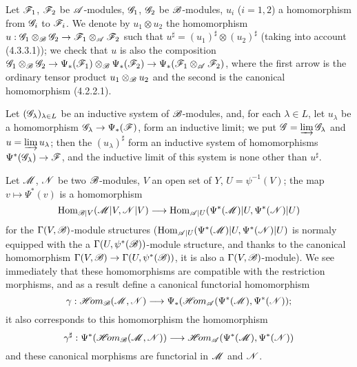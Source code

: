 \begin{env}[4.4.4]
\label{0.4.4.4}
Let $\mathscr{F}_1$, $\mathscr{F}_2$ be $\mathscr{A}$-modules, $\mathscr{G}_1$, $\mathscr{G}_2$ be $\mathscr{B}$-modules,
$u_i$ ($i=1,2$) a homomorphism from $\mathscr{G}_i$ to $\mathscr{F}_i$. We denote by $u_1\otimes u_2$
the homomorphism $u:\sh{G}_1\otimes_\sh{B}\sh{G}_2\to\sh{F}_1\otimes_\sh{A}\sh{F}_2$ such
that $u^\sharp=(u_1)^\sharp\otimes(u_2)^\sharp$ (taking into account (4.3.3.1)); we check
that $u$ is also the composition
$\sh{G}_1\otimes_\sh{B}\sh{G}_2\to\Psi_*(\sh{F}_1)\otimes_\sh{B}\Psi_*(\sh{F}_2)
\to\Psi_*(\sh{F}_1\otimes_\sh{A}\sh{F}_2)$, where the first arrow is the ordinary tensor
product $u_1\otimes_\mathscr{B}u_2$ and the second is the canonical homomorphism (4.2.2.1).
\end{env}

\begin{env}[4.4.5]
\label{0.4.4.5}
Let $(\mathscr{G}_\lambda)_{\lambda\in L}$ be an inductive system of
$\mathscr{B}$-modules, and, for each $\lambda\in L$, let $u_\lambda$ be a
homomorphism $\sh{G}_\lambda\to\Psi_*(\sh{F})$, form an inductive limit; we put
$\mathscr{G}=\varinjlim\mathscr{G}_\lambda$ and $u=\varinjlim u_\lambda$; then the
$(u_\lambda)^\sharp$ form an inductive system of homomorphisms
$\Psi^*(\sh{G}_\lambda)\to\sh{F}$, and the inductive limit of this system is
none other than $u^\sharp$.
\end{env}

\begin{env}[4.4.6]
\label{0.4.4.6}
Let $\mathscr{M}$, $\mathscr{N}$ be two $\mathscr{B}$-modules, $V$ an open set of $Y$,
$U=\psi^{-1}(V)$; the map $v\mapsto\Psi^*(v)$ is a homomorphism
\[
  \Hom_{\sh{B}|V}(\sh{M}|V,\sh{N}|V)
  \to\Hom_{\sh{A}|U}(\Psi^*(\sh{M})|U,\Psi^*(\sh{N})|U)
\]
for the $\Gamma(V,\mathscr{B})$-module structures
(${\mathop{\mathrm{Hom}}\nolimits}_{\mathscr{A}|U}(\Psi^*(\mathscr{M})|U,\Psi^*(\mathscr{N})|U)$ is normaly equipped with the a
$\Gamma(U,\psi^*(\mathscr{B}))$-module structure, and thanks to the canonical homomorphism
 $\Gamma(V,\sh{B})\to\Gamma(U,\psi^*(\sh{B}))$, it is also a
$\Gamma(V,\mathscr{B})$-module). We see immediately that these homomorphisms are compatible with
the restriction morphisms, and as a result define a canonical functorial homomorphism
\[
  \gamma:\shHom_\sh{B}(\sh{M},\sh{N})
  \to\Psi_*(\shHom_\sh{A}(\Psi^*(\sh{M}),\Psi^*(\sh{N}));
\]
it also corresponds to this homomorphism the homomorphism
\[
  \gamma^\sharp:\Psi^*(\shHom_\sh{B}(\sh{M},\sh{N}))
  \to\shHom_\sh{A}(\Psi^*(\sh{M}),\Psi^*(\sh{N}))
\]
and these canonical morphisms are functorial in $\mathscr{M}$ and $\mathscr{N}$.
\end{env}

